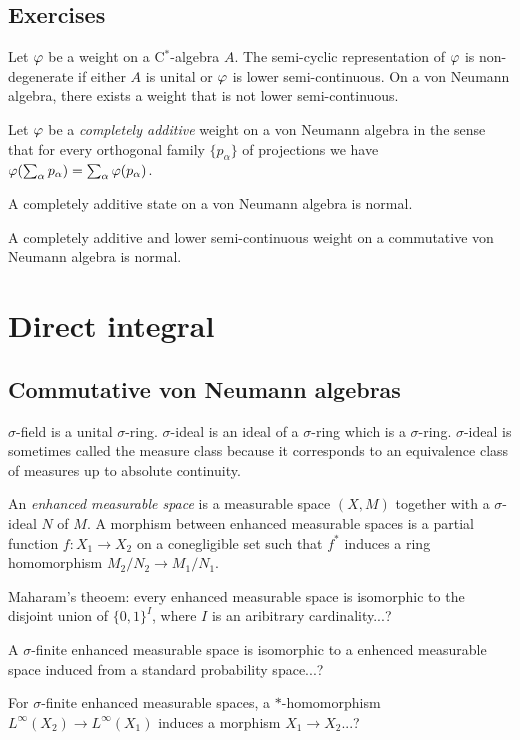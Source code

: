 \documentclass{../../large}
\begin{document}
\section*{Exercises}
\begin{prb}
Let $\varphi$ be a weight on a C$^*$-algebra $A$.
The semi-cyclic representation of $\varphi$ is non-degenerate if either $A$ is unital or $\varphi$ is lower semi-continuous.
On a von Neumann algebra, there exists a weight that is not lower semi-continuous.
\end{prb}

\begin{prb}
Let $\varphi$ be a \emph{completely additive} weight on a von Neumann algebra in the sense that for every orthogonal family $\{p_\alpha\}$ of projections we have $\varphi(\sum_\alpha p_\alpha)=\sum_\alpha\varphi(p_\alpha)$.
\begin{parts}
\item A completely additive state on a von Neumann algebra is normal.
\item A completely additive and lower semi-continuous weight on a commutative von Neumann algebra is normal.
\end{parts}
\end{prb}



\chapter{Direct integral}


\section{Commutative von Neumann algebras}

$\sigma$-field is a unital $\sigma$-ring.
$\sigma$-ideal is an ideal of a $\sigma$-ring which is a $\sigma$-ring.
$\sigma$-ideal is sometimes called the measure class because it corresponds to an equivalence class of measures up to absolute continuity.


\begin{prb}
An \emph{enhanced measurable space} is a measurable space $(X,M)$ together with a $\sigma$-ideal $N$ of $M$.
A morphism between enhanced measurable spaces is a partial function $f:X_1\to X_2$ on a conegligible set such that $f^*$ induces a ring homomorphism $M_2/N_2\to M_1/N_1$.
\begin{parts}
\item Maharam's theoem: every enhanced measurable space is isomorphic to the disjoint union of $\{0,1\}^I$, where $I$ is an aribitrary cardinality...?
\item A $\sigma$-finite enhanced measurable space is isomorphic to a enhenced measurable space induced from a standard probability space...?
\item For $\sigma$-finite enhanced measurable spaces, a $*$-homomorphism $L^\infty(X_2)\to L^\infty(X_1)$ induces a morphism $X_1\to X_2$...?
\end{parts}
\end{prb}
\end{document}
